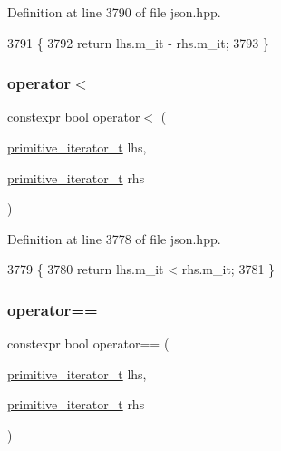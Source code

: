 Definition at line 3790 of file json.\+hpp.


\begin{DoxyCode}
3791     \{
3792         \textcolor{keywordflow}{return} lhs.m\_it - rhs.m\_it;
3793     \}
\end{DoxyCode}
\mbox{\label{classnlohmann_1_1detail_1_1primitive__iterator__t_a901a95e6d73c9509d3dcde914f6c8a9d}} 
\subsubsection{\texorpdfstring{operator$<$}{operator<}}
{\footnotesize\ttfamily constexpr bool operator$<$ (\begin{DoxyParamCaption}\item[{\hyperlink{classnlohmann_1_1detail_1_1primitive__iterator__t}{primitive\+\_\+iterator\+\_\+t}}]{lhs,  }\item[{\hyperlink{classnlohmann_1_1detail_1_1primitive__iterator__t}{primitive\+\_\+iterator\+\_\+t}}]{rhs }\end{DoxyParamCaption})\hspace{0.3cm}{\ttfamily [friend]}}



Definition at line 3778 of file json.\+hpp.


\begin{DoxyCode}
3779     \{
3780         \textcolor{keywordflow}{return} lhs.m\_it < rhs.m\_it;
3781     \}
\end{DoxyCode}
\mbox{\label{classnlohmann_1_1detail_1_1primitive__iterator__t_aae1e1e2ec0e229d1291d69de57d76bbe}} 
\subsubsection{\texorpdfstring{operator==}{operator==}}
{\footnotesize\ttfamily constexpr bool operator== (\begin{DoxyParamCaption}\item[{\hyperlink{classnlohmann_1_1detail_1_1primitive__iterator__t}{primitive\+\_\+iterator\+\_\+t}}]{lhs,  }\item[{\hyperlink{classnlohmann_1_1detail_1_1primitive__iterator__t}{primitive\+\_\+iterator\+\_\+t}}]{rhs }\end{DoxyParamCaption})\hspace{0.3cm}{\ttfamily [friend]}}



